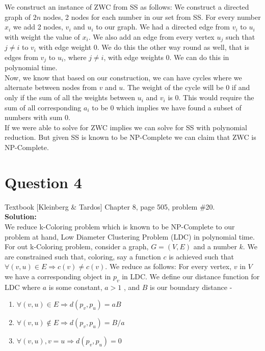 \documentclass[11pt]{article}
\begin{document}
We construct an instance of ZWC from SS as follows: We construct a directed graph of $ 2n $ nodes, 2 nodes for each number in our set from SS. For every number $ x_i $ we add 2 nodes, $ v_i $ and $ u_i $ to our graph. We had a directed edge from $ v_i $ to $ u_i $ with weight the value of $ x_i $. We also add an edge from every vertex $ u_j $ such that $ j \ne i $ to $ v_i $ with edge weight 0. We do this the other way round as well, that is edges from $ v_j $ to $ u_i $, where $ j \ne i $, with edge weights 0. We can do this in polynomial time. \\

Now, we know that based on our construction, we can have cycles where we alternate between nodes from $ v $ and $ u $. The weight of the cycle will be 0 if and only if the sum of all the weights between $ u_i $ and $ v_i $ is 0. This would require the sum of all corresponding $ a_i $ to be 0 which implies we have found a subset of numbers with sum 0. \\

If we were able to solve for ZWC implies we can solve for SS with polynomial reduction. But given SS is known to be NP-Complete we can claim that ZWC is NP-Complete.

\section{Question 4} Textbook [Kleinberg \& Tardos] Chapter 8, page 505, problem \#20. \\
\textbf{Solution:} \\

We reduce k-Coloring problem which is known to be NP-Complete to our problem at hand, Low Diameter Clustering Problem (LDC) in polynomial time. \\

For out k-Coloring problem, consider a graph, $ G=(V, E) $ and a number $ k $. We are constrained such that, coloring, say a function $ c $ is achieved such that $ \forall (v, u) \in E \Rightarrow c(v) \ne c(v)$. We reduce as follows: For every vertex, $ v $ in $ V $ we have a corresponding object in $ p_v $ in LDC. We define our distance function for LDC where $ a $ is some constant, $a > 1$ , and $ B $ is our boundary distance - 
\begin{enumerate}
\item $ \forall (v, u) \in E \Rightarrow d(p_v, p_u) = aB $
\item $ \forall (v, u) \notin E \Rightarrow d(p_v, p_u) = B/a $
\item $ \forall (v, u), v = u \Rightarrow d(p_v, p_u) = 0 $ \end{enumerate}
\end{document}
